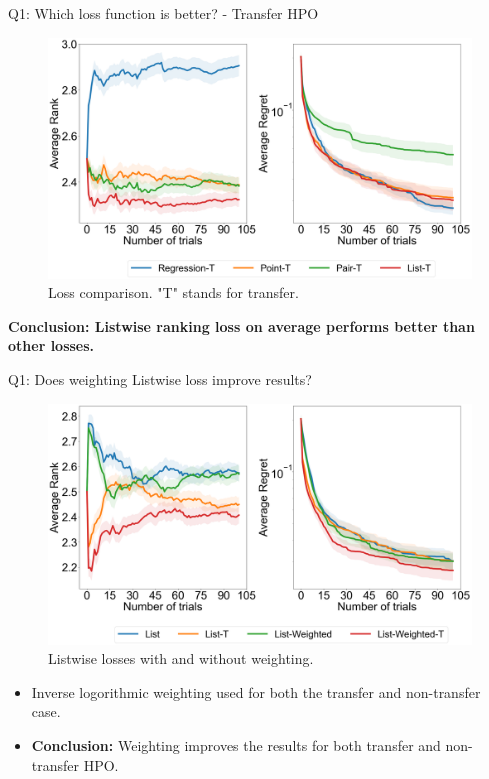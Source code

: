 \documentclass{beamer}
\begin{document}
\begin{frame}[t]{Q1: Which loss function is better? - Transfer HPO}

\begin{figure}[h]
  \centering
    \includegraphics[scale=0.12]{images/Q1AblationTransfer} 
     \caption{Loss comparison. "T" stands for transfer.}
    \label{fig:Q1AblationTransfer}
\end{figure}

\textbf{Conclusion:  Listwise ranking loss on average performs better than other losses.}

\end{frame}

\begin{frame}[t]{Q1: Does weighting Listwise loss improve results?}
\begin{figure}[h]
  \centering
    \includegraphics[scale=0.12]{images/Q2Ablation}
    \caption{Listwise losses with and without weighting.}
    \label{fig:Q2Ablation}
\end{figure}

\begin{itemize}
\item Inverse logorithmic weighting used for both the transfer and non-transfer case.
\item \textbf{Conclusion:} Weighting improves the results for both transfer and non-transfer HPO.
\end{itemize}

\end{frame}
\end{document}
